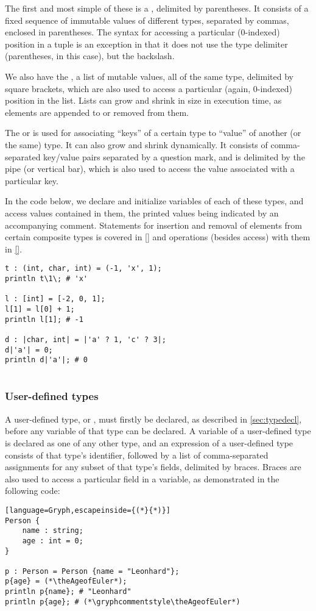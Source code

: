 The first and most simple of these is a , delimited by parentheses. It consists of a fixed sequence of immutable values of different types, separated by commas, enclosed in parentheses. The syntax for accessing a particular (0-indexed) position in a tuple is an exception in that it does not use the type delimiter (parentheses, in this case), but the backslash.

We also have the , a list of mutable values, all of the same type, delimited by square brackets, which are also used to access a particular (again, 0-indexed) position in the list. Lists can grow and shrink in size in execution time, as elements are appended to or removed from them.

The  or  is used for associating ``keys'' of a certain type to ``value'' of another (or the same) type. It can also grow and shrink dynamically. It consists of comma-separated key/value pairs separated by a question mark, and is delimited by the pipe (or vertical bar), which is also used to access the value associated with a particular key.


In the code below, we declare and initialize variables of each of these types, and access values contained in them, the printed values being indicated by an accompanying comment. Statements for insertion and removal of elements from certain composite types is covered in \ref{} and operations (besides access) with them in \ref{}.
\begin{lstlisting}[language=Gryph]
t : (int, char, int) = (-1, 'x', 1);
println t\1\; # 'x'

l : [int] = [-2, 0, 1];
l[1] = l[0] + 1;
println l[1]; # -1

d : |char, int| = |'a' ? 1, 'c' ? 3|;
d|'a'| = 0;
println d|'a'|; # 0


\end{lstlisting}
\subsubsection{User-defined types}
\label{sec:usertypes}
A user-defined type, or , must firstly be declared, as described in \ref{sec:typedecl}, before any variable of that type can be declared. A variable of a user-defined type is declared as one of any other type, and an expression of a user-defined type consists of that type's identifier, followed by a list of comma-separated assignments for any subset of that type's fields, delimited by braces. Braces are also used to access a particular field in a  variable, as demonstrated in the following code:
\setcounter{AgeofEuler}{\year-1707}
\begin{lstlisting}[language=Gryph,escapeinside={(*}{*)}]
Person {
	name : string;
	age : int = 0;
}

p : Person = Person {name = "Leonhard"};
p{age} = (*\theAgeofEuler*);
println p{name}; # "Leonhard"
println p{age}; # (*\gryphcommentstyle\theAgeofEuler*)
\end{lstlisting}